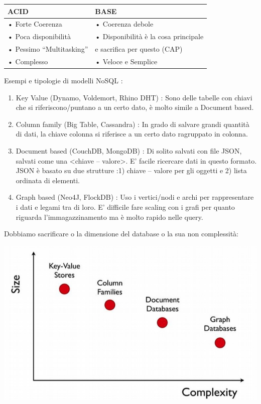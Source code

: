\documentclass[a4page, 11pt]{article}
\begin{document}
\begin{center}
\begin{tabular}{|l|l|}
\hline
ACID & BASE \\
\hline
• Forte Coerenza & • Coerenza debole\\
• Poca disponibilità & • Disponibilità è la cosa principale\\
• Pessimo “Multitasking” & \quad e sacrifica per questo (CAP)\\
• Complesso & • Veloce e Semplice\\
\hline

\end{tabular}
\end{center}
Esempi e tipologie di modelli NoSQL :

\begin{enumerate}[noitemsep]
	 
	\item
	Key Value (Dynamo, Voldemort, Rhino DHT) : Sono delle tabelle con	chiavi che si riferiscono/puntano a un certo dato, è molto simile a Document based. 
	\item
	Column family (Big Table, Cassandra) : In grado di salvare grandi quantità di dati, la chiave colonna si riferisce a un certo dato ragruppato in colonna.
	\item
	Document based (CouchDB, MongoDB) : Di solito salvati con file JSON, salvati come una \textless{}chiave -- valore\textgreater{}. E' facile ricercare dati in questo formato. JSON è basato su due strutture :1) chiave -- valore per gli oggetti e 2) lista ordinata di elementi.
	\item
	Graph based (Neo4J, FlockDB) : Uso i vertici/nodi e archi per
	rappresentare i dati e legami tra di loro. E' difficile fare scaling	con i grafi per quanto riguarda l'immagazzinamento ma è molto rapido nelle query.
\end{enumerate}
Dobbiamo sacrificare o la dimensione del database o la sua non complessità:
\begin{center}
	\includegraphics[scale=0.5]{IMAGE1.jpg}
\end{center}
\end{document}
